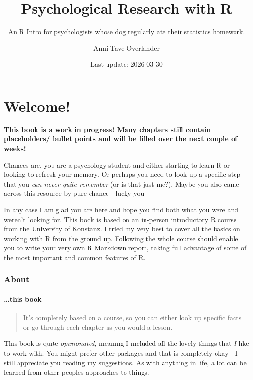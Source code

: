 \documentclass[
]{book}
\title{Psychological Research with R}
\subtitle{An R Intro for psychologists whose dog regularly ate their statistics homework.}
\author{Anni Tave Overlander}
\date{Last update: 2026-03-30}
\begin{document}
\maketitle

{
\setcounter{tocdepth}{1}
\tableofcontents
}
\chapter*{Welcome!}\label{welcome}

\textbf{This book is a work in progress! Many chapters still contain placeholders/ bullet points and will be filled over the next couple of weeks!}

Chances are, you are a psychology student and either starting to learn R or looking to refresh your memory.
Or perhaps you need to look up a specific step that you \emph{can never quite remember} (or is that just me?).
Maybe you also came across this resource by pure chance - lucky you!

In any case I am glad you are here and hope you find both what you were and weren't looking for.
This book is based on an in-person introductory R course from the \href{https://www.uni-konstanz.de/}{University of Konstanz}.
I tried my very best to cover all the basics on working with R from the ground up.
Following the whole course should enable you to write your very own R Markdown report, taking full advantage of some of the most important and common features of R.

\subsection*{About}\label{about}

\subsubsection*{\ldots this book}\label{this-book}

\begin{quote}
It's completely based on a course, so you can either look up specific facts or go through each chapter as you would a lesson.
\end{quote}

This book is quite \emph{opinionated}, meaning I included all the lovely things that \emph{I} like to work with.
You might prefer other packages and that is completely okay - I still appreciate you reading my suggestions.
As with anything in life, a lot can be learned from other peoples approaches to things.
\end{document}
